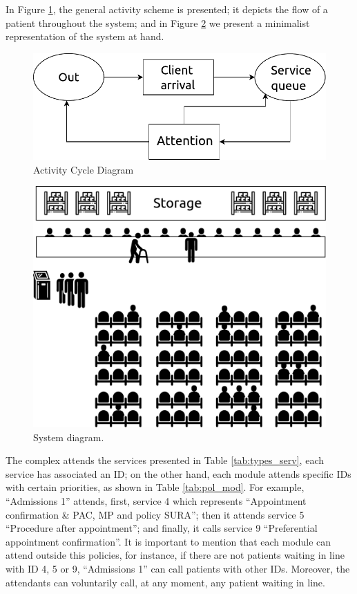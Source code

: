 In Figure \ref{fig:act_cycl}, the general activity scheme is presented; it depicts the flow of a patient throughout the system; and in Figure \ref{fig:system} we present a minimalist representation of the system at hand.
\begin{figure}[H]
    \centering
    \includegraphics[scale=.8]{files/activity_cycle.pdf}
    \caption{Activity Cycle Diagram}
    \label{fig:act_cycl}
\end{figure}
\begin{figure}[H]
    \centering
    \includegraphics[scale=.5]{files/drawing.pdf}
    \caption{System diagram.}
    \label{fig:system}
\end{figure}

The complex attends the services presented in Table \ref{tab:types_serv}, each service has associated an ID; on the other hand, each module attends specific IDs with certain priorities, as shown in Table \ref{tab:pol_mod}. For example, ``Admissions 1'' attends, first, service 4 which represents ``Appointment confirmation \& PAC, MP and policy SURA''; then it attends service 5 ``Procedure after appointment''; and finally, it calls service 9 ``Preferential appointment confirmation''. It is important to mention that each module can attend outside this policies, for instance, if there are not patients waiting in line with ID 4, 5 or 9, ``Admissions 1'' can call patients with other IDs. Moreover, the attendants can voluntarily call, at any moment, any patient waiting in line.


